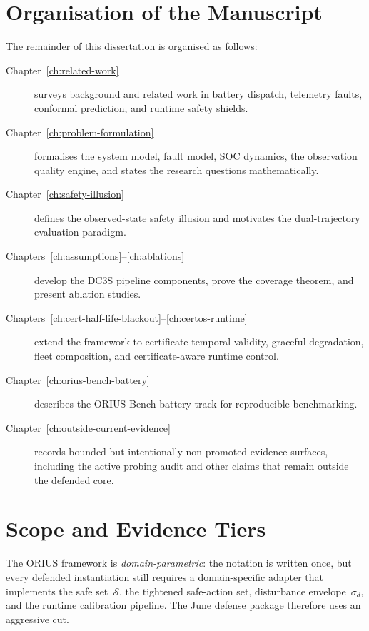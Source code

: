 \section{Organisation of the Manuscript}

The remainder of this dissertation is organised as follows:

\begin{description}
  \item[Chapter~\ref{ch:related-work}] surveys background and related work
    in battery dispatch, telemetry faults, conformal prediction, and
    runtime safety shields.
  \item[Chapter~\ref{ch:problem-formulation}] formalises the system model,
    fault model, SOC dynamics, the observation quality engine, and states
    the research questions mathematically.
  \item[Chapter~\ref{ch:safety-illusion}] defines the observed-state
    safety illusion and motivates the dual-trajectory evaluation paradigm.
  \item[Chapters~\ref{ch:assumptions}--\ref{ch:ablations}] develop the DC3S pipeline components, prove the
    coverage theorem, and present ablation studies.
  \item[Chapters~\ref{ch:cert-half-life-blackout}--\ref{ch:certos-runtime}]
    extend the framework to certificate temporal validity, graceful
    degradation, fleet composition, and certificate-aware runtime control.
  \item[Chapter~\ref{ch:orius-bench-battery}] describes the ORIUS-Bench
    battery track for reproducible benchmarking.
  \item[Chapter~\ref{ch:outside-current-evidence}] records bounded but
    intentionally non-promoted evidence surfaces, including the active
    probing audit and other claims that remain outside the defended core.
\end{description}

\section{Scope and Evidence Tiers}\label{sec:scope-tiers}

The ORIUS framework is \emph{domain-parametric}: the notation is written once,
but every defended instantiation still requires a domain-specific adapter that
implements the safe set~$\mathcal{S}$, the tightened safe-action set,
disturbance envelope~$\sigma_d$, and the runtime calibration pipeline.  The
June defense package therefore uses an aggressive cut.

